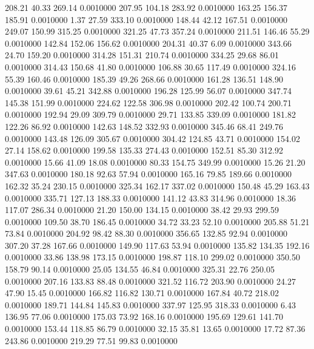  208.21   40.33  269.14   0.0010000
 207.95  104.18  283.92   0.0010000
 163.25  156.37  185.91   0.0010000
   1.37   27.59  333.10   0.0010000
 148.44   42.12  167.51   0.0010000
 249.07  150.99  315.25   0.0010000
 321.25   47.73  357.24   0.0010000
 211.51  146.46   55.29   0.0010000
 142.84  152.06  156.62   0.0010000
 204.31   40.37    6.09   0.0010000
 343.66   24.70  159.20   0.0010000
 314.28  151.31  210.74   0.0010000
 334.25   29.68   86.01   0.0010000
 314.43  150.68   41.80   0.0010000
 106.88   30.65  117.49   0.0010000
 324.16   55.39  160.46   0.0010000
 185.39   49.26  268.66   0.0010000
 161.28  136.51  148.90   0.0010000
  39.61   45.21  342.88   0.0010000
 196.28  125.99   56.07   0.0010000
 347.74  145.38  151.99   0.0010000
 224.62  122.58  306.98   0.0010000
 202.42  100.74  200.71   0.0010000
 192.94   29.09  309.79   0.0010000
  29.71  133.85  339.09   0.0010000
 181.82  122.26   86.92   0.0010000
 142.63  148.52  332.93   0.0010000
 345.46   68.41  249.76   0.0010000
 143.48  126.09  305.67   0.0010000
 304.42  124.85   43.71   0.0010000
 154.02   27.14  158.62   0.0010000
 199.58  135.33  274.43   0.0010000
 152.51   85.30  312.92   0.0010000
  15.66   41.09   18.08   0.0010000
  80.33  154.75  349.99   0.0010000
  15.26   21.20  347.63   0.0010000
 180.18   92.63   57.94   0.0010000
 165.16   79.85  189.66   0.0010000
 162.32   35.24  230.15   0.0010000
 325.34  162.17  337.02   0.0010000
 150.48   45.29  163.43   0.0010000
 335.71  127.13  188.33   0.0010000
 141.12   43.83  314.96   0.0010000
  18.36  117.07  286.34   0.0010000
  21.20  150.00  134.15   0.0010000
  38.42   29.93  299.59   0.0010000
 109.50   38.70  186.45   0.0010000
  34.72   33.23   52.10   0.0010000
 205.88   51.21   73.84   0.0010000
 204.92   98.42   88.30   0.0010000
 356.65  132.85   92.94   0.0010000
 307.20   37.28  167.66   0.0010000
 149.90  117.63   53.94   0.0010000
 135.82  134.35  192.16   0.0010000
  33.86  138.98  173.15   0.0010000
 198.87  118.10  299.02   0.0010000
 350.50  158.79   90.14   0.0010000
  25.05  134.55   46.84   0.0010000
 325.31   22.76  250.05   0.0010000
 207.16  133.83   88.48   0.0010000
 321.52  116.72  203.90   0.0010000
  24.27   47.90   15.45   0.0010000
 166.82  116.82  130.71   0.0010000
 167.84   40.72  218.02   0.0010000
 189.71  144.84  145.83   0.0010000
 337.97  125.95  318.33   0.0010000
   6.43  136.95   77.06   0.0010000
 175.03   73.92  168.16   0.0010000
 195.69  129.61  141.70   0.0010000
 153.44  118.85   86.79   0.0010000
  32.15   35.81   13.65   0.0010000
  17.72   87.36  243.86   0.0010000
 219.29   77.51   99.83   0.0010000
